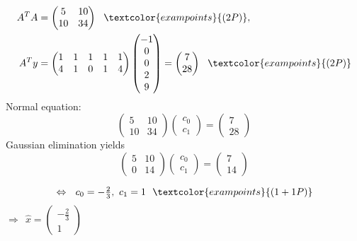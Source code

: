 {\begin{enumerate}
	\begin{align*}
	A^TA&=\begin{pmatrix}5&10\\10&34\end{pmatrix}~~\textcolor{exampoints}{(2P)},\\
	A^Ty&=\begin{pmatrix}1&1&1&1&1\\4&1&0&1&4\end{pmatrix}
	\begin{pmatrix}-1\\0\\0\\2\\9\end{pmatrix}
	=\begin{pmatrix}7\\28\end{pmatrix}~~\textcolor{exampoints}{(2P)}
	\end{align*}
	Normal equation: 
	$$\begin{pmatrix}5&10\\10&34\end{pmatrix}\begin{pmatrix}c_0\\c_1\end{pmatrix}
	=\begin{pmatrix}7\\28\end{pmatrix}$$
	Gaussian elimination yields
	$$\begin{pmatrix}5&10\\0&14\end{pmatrix}\begin{pmatrix}c_0\\c_1\end{pmatrix}
	=\begin{pmatrix}7\\14\end{pmatrix}$$
	
	$$\Leftrightarrow~~c_0=-\tfrac{2}{3},~c_1=1~~\textcolor{exampoints}{(1+1P)}$$
	$\Rightarrow~~\hat{x}=\begin{pmatrix}-\tfrac{2}{3}\\1\end{pmatrix}$

\end{enumerate}
}
